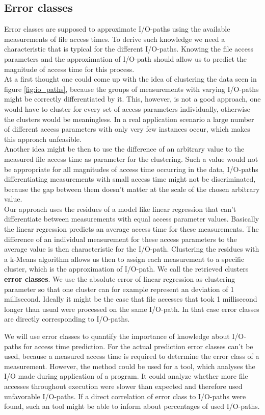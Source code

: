 \documentclass{superfri}
\begin{document}
\subsection{Error classes}
\label{sec:error_classes}
Error classes are supposed to approximate I/O-paths using the available measurements of file access times.
To derive such knowledge we need a characteristic that is typical for the different I/O-paths. Knowing the file access parameters and the approximation of I/O-path should allow us to predict the magnitude of access time for this process.\\
At a first thought one could come up with the idea of clustering the data seen in figure \ref{fig:io_paths}, because the groups of measurements with varying I/O-paths might be correctly differentiated by it. 
This, however, is not a good approach, one would have to cluster for every set of access parameters individually, otherwise the clusters would be meaningless. In a real application scenario a large number of different access parameters with only very few instances occur, which makes this approach unfeasible.\\
Another idea might be then to use the difference of an arbitrary value to the measured file access time as parameter for the clustering. 
Such a value would not be appropriate for all magnitudes of access time occurring in the data, I/O-paths differentiating measurements with small access time might not be discriminated, because the gap between them doesn't matter at the scale of the chosen arbitrary value.\\
Our approach uses the residues of a model like linear regression that can't differentiate between measurements with equal access parameter values.
Basically the linear regression predicts an average access time for these measurements.
The difference of an individual measurement for these access parameters to the average value is then characteristic for the I/O-path.
Clustering the residues with a k-Means algorithm allows us then to assign each measurement to a specific cluster, which is the approximation of I/O-path.
We call the retrieved clusters \textbf{error classes}.
We use the absolute error of linear regression as clustering parameter so that one cluster can for example represent an deviation of 1 millisecond.
Ideally it might be the case that file accesses that took 1 millisecond longer than usual were processed on the same I/O-path.
In that case error classes are directly corresponding to I/O-paths. \medskip

We will use error classes to quantify the importance of knowledge about I/O-paths for access time prediction.
For the actual prediction error classes can't be used, because a measured access time is required to determine the error class of a measurement.
However, the method could be used for a tool, which analyses the I/O made during application of a program. 
It could analyze whether more file accesses throughout execution were slower than expected and therefore used unfavorable I/O-paths.
If a direct correlation of error class to I/O-paths were found, such an tool might be able to inform about percentages of used I/O-paths.
\end{document}

